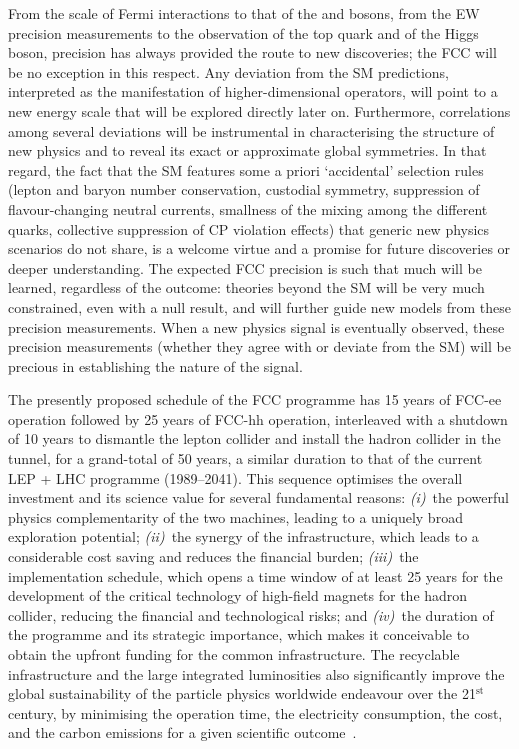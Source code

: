From the scale of Fermi interactions to that of the \PW and \PZ bosons, from the EW precision measurements to the observation of the top quark and of the Higgs boson, precision has always provided the route to new discoveries; the FCC will be no exception in this respect. 
Any deviation from the SM predictions, interpreted as the manifestation of higher-dimensional operators, will point to a new energy scale that will be explored directly later on. 
Furthermore, correlations among several deviations will be instrumental in characterising the structure of new physics and to reveal its exact or approximate global symmetries. 
In that regard, the fact that the SM features some a priori `accidental' selection rules (lepton and baryon number conservation, custodial symmetry, suppression of flavour-changing neutral currents, smallness of the mixing among the different quarks, collective suppression of CP violation effects) that generic new physics scenarios do not share, is a welcome virtue and a promise for future discoveries or deeper understanding. 
The expected FCC precision is such that much will be learned, regardless of the outcome: theories beyond the SM will be very much constrained, even with a null result, and will further guide new models from these precision measurements. 
When a new physics signal is eventually observed, these precision measurements (whether they agree with or deviate from the SM) will be precious in establishing the nature of the signal.

The presently proposed schedule of the FCC programme has 15 years of FCC-ee operation followed by 25 years of FCC-hh operation, interleaved with a shutdown of 10 years to dismantle the lepton collider and install the hadron collider in the tunnel, for a grand-total of 50 years, a similar duration to that of the current LEP + LHC programme (1989--2041). 
This sequence optimises the overall investment and its science value for several fundamental reasons: 
{\it (i)}~the powerful physics complementarity of the two machines, leading to a uniquely broad exploration potential; 
{\it (ii)}~the synergy of the infrastructure, which leads to a considerable cost saving and reduces the financial burden; 
{\it (iii)}~the implementation schedule, which opens a time window of at least 25 years for the development of  the critical technology of high-field magnets for the hadron collider, reducing the financial and technological risks; and 
{\it (iv)}~the duration of the programme and its strategic importance, which makes it conceivable to obtain the upfront funding for the common infrastructure. 
The recyclable infrastructure and the large integrated luminosities also significantly improve the global sustainability of the particle physics worldwide endeavour over the 21$^\text{st}$ century, by minimising the operation time, the electricity consumption, the cost, and the carbon emissions for a given scientific outcome~\cite{Janot:2022jtn,Blondel:2024mry}.

